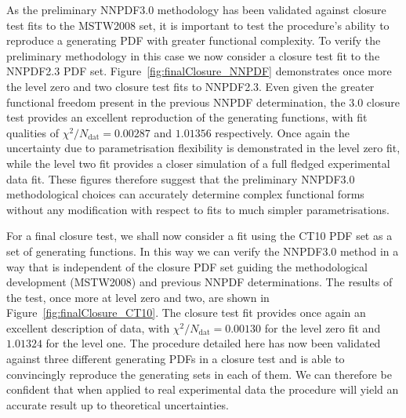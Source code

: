 As the preliminary NNPDF3.0 methodology has been validated against closure test fits to the MSTW2008 set, it is important to test the procedure's ability to reproduce a generating PDF with greater functional complexity. To verify the preliminary methodology in this case we now consider a closure test fit to the NNPDF2.3 PDF set. Figure~\ref{fig:finalClosure_NNPDF} demonstrates once more the level zero and two closure test fits to NNPDF2.3. Even given the greater functional freedom present in the previous NNPDF determination, the 3.0 closure test provides an excellent reproduction of the generating functions, with fit qualities of  $\chi^2/N_{\text{dat}} = 0.00287$ and $1.01356$ respectively. Once again the uncertainty due to parametrisation flexibility is demonstrated in the level zero fit, while the level two fit provides a closer simulation of a full fledged experimental data fit. These figures therefore suggest that the preliminary NNPDF3.0 methodological choices can accurately determine complex functional forms without any modification with respect to fits to much simpler parametrisations.

For a final closure test, we shall now consider a fit using the CT10 PDF set as a set of generating functions. In this way we can verify the NNPDF3.0 method in a way that is independent of the closure PDF set guiding the methodological development (MSTW2008) and previous NNPDF determinations. The results of the test, once more at level zero and two, are shown in Figure~\ref{fig:finalClosure_CT10}. The closure test fit provides once again an excellent description of data, with $\chi^2/N_{\text{dat}} = 0.00130$ for the level zero fit and $1.01324$ for the level one. The procedure detailed here has now been validated against three different generating PDFs in a closure test and is able to convincingly reproduce the generating sets in each of them. We can therefore be confident that when applied to real experimental data the procedure will yield an accurate result up to theoretical uncertainties.

